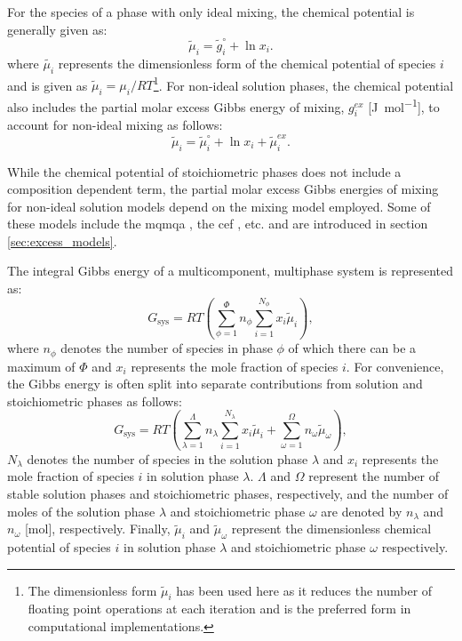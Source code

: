 For the species of a phase with only ideal mixing, the chemical potential is generally given as:
    \begin{equation}
            \tilde{\mu}_{i} = \tilde{g}_{i}^\circ + \ln x_{i}.
    \end{equation}
where $\tilde{\mu_i}$ represents the dimensionless form of the chemical potential of species $i$ and is given as $\tilde{\mu}_i = \mu_i / RT$\footnote{The dimensionless form $\tilde{\mu}_i$ has been used here as it reduces the number of floating point operations at each iteration and is the preferred form in computational implementations.}.
For non-ideal solution phases, the chemical potential also includes the partial molar excess Gibbs energy of mixing, $g_{i}^{ex}$ [\si{\joule \per \mole}], to account for non-ideal mixing as follows:
    \begin{equation}\label{eq:mu_ex}
            \tilde{\mu}_i = \tilde{\mu}_{i}^\circ + \ln x_{i} + \tilde{\mu}_{i}^{ex}.
    \end{equation}

    While the chemical potential of stoichiometric phases does not include a composition dependent term, the partial molar excess Gibbs energies of mixing for non-ideal solution models depend on the mixing model employed. Some of these models include the \gls{mqmqa} \cite{Pelton00,Pelton01,Chartrand01,Pelton01b,Lambotte11}, the \gls{cef} \cite{Hillert01}, etc. and are introduced in section \ref{sec:excess_models}.

The integral Gibbs energy of a multicomponent, multiphase system is represented as:
\begin{equation}\label{eqn:integralGibbs1}
            G_\text{sys} = RT \left ( \sum_{\phi=1}^{\Phi} n_{\phi} \sum_{i=1}^{N_{\phi}}x_{i}\tilde{\mu}_i \right ),
\end{equation}
where $n_{\phi}$ denotes the number of species in phase $\phi$ of which there can be a maximum of $\Phi$ and $x_{i}$ represents the mole fraction of species $i$. For convenience, the Gibbs energy is often split into separate contributions from solution and stoichiometric phases as follows:
    \begin{equation}\label{eqn:integralGibbs}
            G_\text{sys} = RT \left ( \sum_{\lambda=1}^{\Lambda} n_{\lambda} \sum_{i=1}^{N_{\lambda}}x_{i}\tilde{\mu}_i + \sum_{\omega=1}^{\Omega} n_{\omega} \tilde{\mu}_{\omega} \right ),
    \end{equation}
    $N_{\lambda}$ denotes the number of species in the solution phase $\lambda$ and $x_{i}$ represents the mole fraction of species $i$ in solution phase $\lambda$. $\Lambda$ and $\Omega$ represent the number of stable solution phases and stoichiometric phases, respectively, and the number of moles of the solution phase $\lambda$ and stoichiometric phase $\omega$ are denoted by $n_\lambda$ and $n_\omega$ [\si{\mole}], respectively. Finally, $\tilde{\mu}_i$ and $\tilde{\mu}_\omega$ represent the dimensionless chemical potential of species $i$ in solution phase $\lambda$ and stoichiometric phase $\omega$ respectively.

